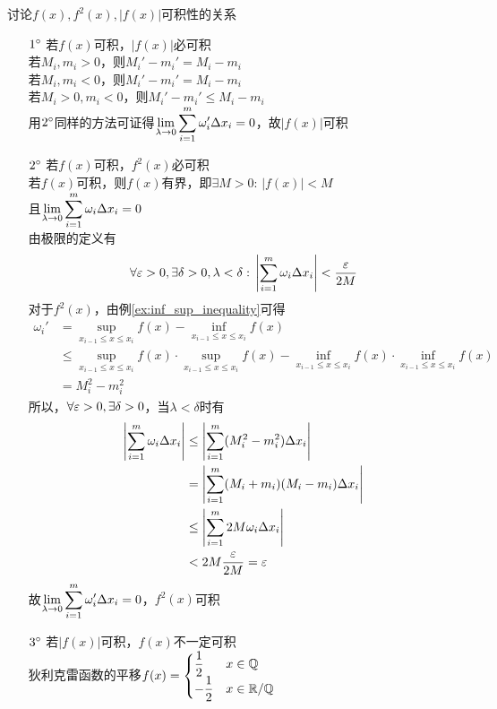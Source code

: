 \begin{example}
\label{ex:f_f2_absf_relation}
讨论$f(x),f^2(x),|f(x)|$可积性的关系
\end{example}
\begin{analysis}
\begin{enumerate}
	\item[$1\degree$] 若$f(x)$可积，$|f(x)|$必可积\\
若$M_i,m_i>0$，则$M_i'-m_i'=M_i-m_i$\\
若$M_i,m_i<0$，则$M_i'-m_i'=M_i-m_i$\\
若$M_i>0,m_i<0$，则$M_i'-m_i'\leq M_i-m_i$\\
用$2\degree$同样的方法可证得$\displaystyle\lim_{\lambda\to 0}\sum_{i=1}^m\omega'_i\Delta x_i=0$，故$|f(x)|$可积
	\item[$2\degree$] 若$f(x)$可积，$f^2(x)$必可积\\
若$f(x)$可积，则$f(x)$有界，即$\exists M>0:\,|f(x)|<M$\\
且$\displaystyle\lim_{\lambda\to 0}\sum_{i=1}^m\omega_i\Delta x_i=0$\\
由极限的定义有
\[\forall\varepsilon>0,\exists\delta>0,\lambda<\delta:\,\left|\sum_{i=1}^m\omega_i\Delta x_i\right|<\dfrac{\varepsilon}{2M}\]
对于$f^2(x)$，由例\ref{ex:inf_sup_inequality}可得
\[\begin{aligned}
\omega_i'&=\sup_{x_{i-1}\leq x\leq x_i}f(x)-\inf_{x_{i-1}\leq x\leq x_i}f(x)\\
&\leq \sup_{x_{i-1}\leq x\leq x_i}f(x)\cdot\sup_{x_{i-1}\leq x\leq x_i}f(x)-
\inf_{x_{i-1}\leq x\leq x_i}f(x)\cdot\inf_{x_{i-1}\leq x\leq x_i}f(x)\\
&=M_i^2-m_i^2
\end{aligned}\]
所以，$\forall\varepsilon>0,\exists\delta>0$，当$\lambda<\delta$时有
\[\begin{aligned}
\left|\sum_{i=1}^m\omega_i\Delta x_i\right|&\leq\left|\sum_{i=1}^m(M_i^2-m_i^2)\Delta x_i\right|\\
&=\left|\sum_{i=1}^m(M_i+m_i)(M_i-m_i)\Delta x_i\right|\\
&\leq\left|\sum_{i=1}^m2M\omega_i\Delta x_i\right|\\
&<2M\dfrac{\varepsilon}{2M}=\varepsilon
\end{aligned}\]
故$\displaystyle\lim_{\lambda\to 0}\sum_{i=1}^m\omega'_i\Delta x_i=0$，$f^2(x)$可积
	\item[$3\degree$] 若$|f(x)|$可积，$f(x)$不一定可积\\
狄利克雷函数的平移$f(x)=\begin{cases}\dfrac{1}{2}&x\in\mathbb{Q}\\
-\dfrac{1}{2}&x\in\mathbb{R}/\mathbb{Q}\end{cases}$

\end{enumerate}
\end{analysis}
